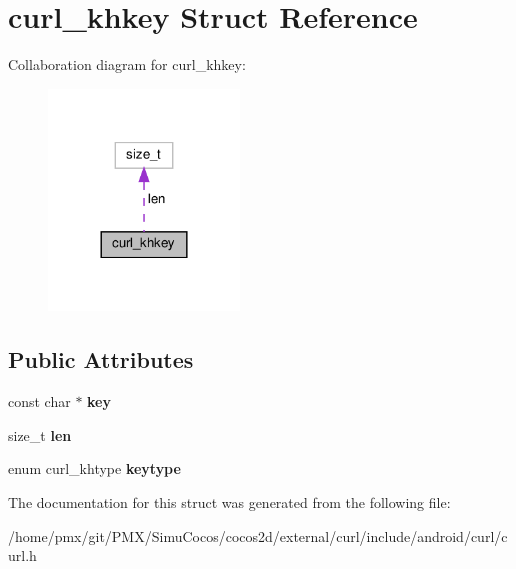 \hypertarget{structcurl__khkey}{}\section{curl\+\_\+khkey Struct Reference}
\label{structcurl__khkey}


Collaboration diagram for curl\+\_\+khkey\+:
\nopagebreak
\begin{figure}[H]
\begin{center}
\leavevmode
\includegraphics[width=144pt]{structcurl__khkey__coll__graph}
\end{center}
\end{figure}
\subsection*{Public Attributes}
\begin{DoxyCompactItemize}
\item 
\mbox{\label{structcurl__khkey_a7c35a6fb7c2cae70101b5473cdcbcf57}} 
const char $\ast$ {\bfseries key}
\item 
\mbox{\label{structcurl__khkey_abb9d6b5435d96a5abc8dbb1e29cbee4e}} 
size\+\_\+t {\bfseries len}
\item 
\mbox{\label{structcurl__khkey_aebcbb84554e2e574d209132be43697f8}} 
enum curl\+\_\+khtype {\bfseries keytype}
\end{DoxyCompactItemize}


The documentation for this struct was generated from the following file\+:\begin{DoxyCompactItemize}
\item 
/home/pmx/git/\+P\+M\+X/\+Simu\+Cocos/cocos2d/external/curl/include/android/curl/curl.\+h\end{DoxyCompactItemize}
